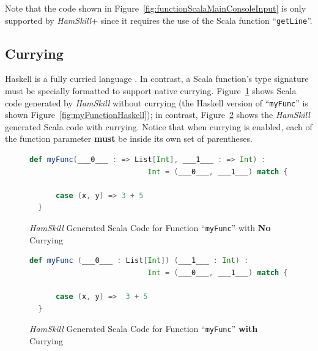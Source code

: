 \documentclass{report}
\begin{document}
Note that the code shown in Figure~\ref{fig:functionScalaMainConsoleInput} is only supported by \textit{HamSkill}+ since it requires the use of the Scala function ``\texttt{getLine}''.

\subsection{Currying}\label{sec:currying}

Haskell is a fully curried language \cite{learnYouAHaskell}.  In contrast, a Scala function's type signature must be specially formatted to support native currying. Figure~\ref{fig:myFuncInScalaNoCurrying} shows Scala code generated by \textit{HamSkill} without currying (the Haskell version of ``\texttt{myFunc}'' is shown Figure~\ref{fig:myFunctionHaskell}); in contrast, Figure~\ref{fig:myFuncInScalaWithCurrying} shows the \textit{HamSkill} generated Scala code with currying.  Notice that when currying is enabled, each of the function parameter \textbf{must} be inside its own set of parentheses.

\begin{figure}[H]
\begin{mdframed}
\begin{lstlisting}[basicstyle=\small, language=scala]
  def myFunc(___0___ : => List[Int], ___1___ : => Int) : 
                           Int = (___0___, ___1___) match {
      
      case (x, y) => 3 + 5
  } 
\end{lstlisting}
\end{mdframed}
\caption{\textit{HamSkill} Generated Scala Code for Function ``\texttt{myFunc}'' with \textbf{No} Currying}\label{fig:myFuncInScalaNoCurrying}
\end{figure}

\begin{figure}[H]
\begin{mdframed}
\begin{lstlisting}[basicstyle=\small, language=scala]
  def myFunc (___0___ : List[Int]) (___1___ : Int) :  
                           Int = (___0___, ___1___) match {
      
      case (x, y) =>  3 + 5
  }
\end{lstlisting}
\end{mdframed}
\caption{\textit{HamSkill} Generated Scala Code for Function ``\texttt{myFunc}'' \textbf{with} Currying}\label{fig:myFuncInScalaWithCurrying}
\end{figure}
\end{document}
